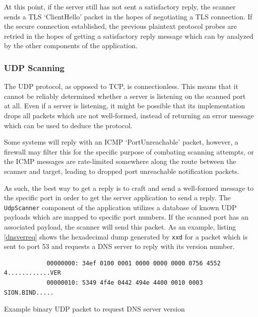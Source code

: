 \documentclass[a4paper,12pt]{article}
\begin{document}
	At this point, if the server still has not sent a satisfactory reply, the scanner sends a TLS `ClientHello' packet in the hopes of negotiating a TLS connection. If the secure connection established, the previous plaintext protocol probes are retried in the hopes of getting a satisfactory reply message which can by analyzed by the other components of the application.

\subsubsection{UDP Scanning} \label{udpscan}
 

	The UDP protocol, as opposed to TCP, is connectionless. This means that it cannot be reliably determined whether a server is listening on the scanned port at all. Even if a server is listening, it might be possible that its implementation drops all packets which are not well-formed, instead of returning an error message which can be used to deduce the protocol.
	
	Some systems will reply with an ICMP `PortUnreachable' packet, however, a firewall may filter this for the specific purpose of combating scanning attempts, or the ICMP messages are rate-limited somewhere along the route between the scanner and target, leading to dropped port unreachable notification packets.
	
	As such, the best way to get a reply is to craft and send a well-formed message to the specific port in order to get the server application to send a reply. The \texttt{UdpScanner} component of the application utilizes a database of known UDP payloads which are mapped to specific port numbers. If the scanned port has an associated payload, the scanner will send this packet. As an example, listing \ref{dnsverreq} shows the hexadecimal dump generated by \texttt{xxd} for a packet which is sent to port 53 and requests a DNS server to reply with its version number.

	\begin{listing}[H]
		\begin{verbatim}
			00000000: 34ef 0100 0001 0000 0000 0000 0756 4552  4............VER
			00000010: 5349 4f4e 0442 494e 4400 0010 0003       SION.BIND.....
		\end{verbatim}
		\caption{Example binary UDP packet to request DNS server version}
		\label{dnsverreq}
	\end{listing}
	
\end{document}
